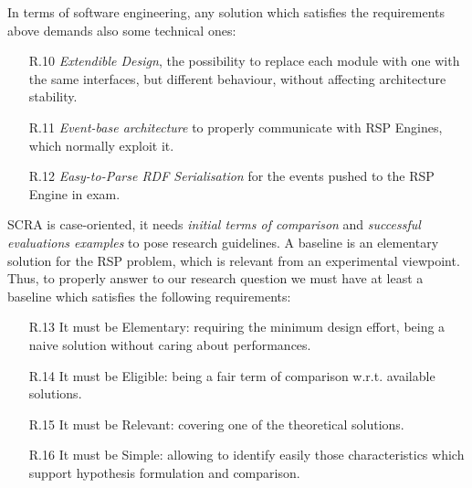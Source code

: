 In terms of software engineering, any solution which satisfies the requirements above demands also some technical ones: 
\begin{enumerate}
\item[R.10] \textit{Extendible Design}, the possibility to replace each module with one with the same interfaces, but different behaviour, without affecting architecture stability.
\item[R.11] \textit{Event-base architecture} to properly communicate with  RSP Engines, which normally exploit it.
\item[R.12] \textit{Easy-to-Parse RDF Serialisation} for the events pushed to the RSP Engine in exam.
\end{enumerate}

\noindent SCRA is case-oriented, it needs  \textit{initial terms of comparison} and \textit{successful evaluations examples} to pose research guidelines. A baseline is an elementary solution for the RSP problem, which is relevant from an experimental viewpoint. Thus, to properly answer to our research question we must have at least a baseline which satisfies the following requirements: 
\begin{enumerate}
\item[R.13] It must be Elementary: requiring the minimum design effort, being a naive solution without caring about performances.  %
\item[R.14] It must be Eligible: being a fair term of comparison w.r.t. available solutions. %
\item[R.15] It must be Relevant: covering one of the theoretical solutions. %
\item[R.16] It must be Simple: allowing to identify easily those characteristics which support hypothesis formulation and comparison.  %
\end{enumerate}

